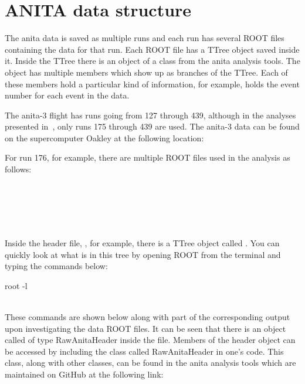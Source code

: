 \chapter{ANITA data structure}

The \gls{anita} data is saved as multiple runs and each run has several ROOT files containing the data for that run. Each ROOT file has a TTree object saved inside it. Inside the TTree there is an object of a class from the \gls{anita} analysis tools. The object has multiple members which show up as branches of the TTree. Each of these members hold a particular kind of information, for example,  holds the event number for each event in the data. 

The \gls{anita}-3 flight has runs going from 127 through 439, although in the analyses presented in~\cite{samStaffordThesis,jacobGordonThesis}, only runs 175 through 439 are used. The \gls{anita}-3 data can be found on the supercomputer Oakley at the following location: 

\begin{center}
\end{center}

For run 176, for example, there are multiple ROOT files used in the analysis as follows: 

\begin{center}
\\
\\
\\
\\
\end{center}

Inside the header file, , for example, there is a TTree object called . You can quickly look at what is in this tree by opening ROOT from the terminal and typing the commands below:

\begin{center}
root -l  \\
 \\
\end{center}

These commands are shown below along with part of the corresponding output upon investigating the data ROOT files. It can be seen that there is an object called  of type RawAnitaHeader inside the  file. Members of the header object can be accessed by including the class called RawAnitaHeader in one's code. This class, along with other classes, can be found in the \gls{anita} analysis tools which are maintained on GitHub at the following link:

